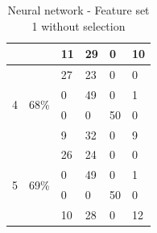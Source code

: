 \documentclass[USenglish]{ifimaster}  %
\begin{document}
\begin{table}[h]
\begin{tabular}{@{}llllll@{}}
			\multicolumn{1}{l|}{} & \multicolumn{1}{l|}{} & \multicolumn{1}{l|}{11} & \multicolumn{1}{l|}{29} & \multicolumn{1}{l|}{0} & 10 \\ \midrule
			\multicolumn{1}{l|}{\multirow{4}{*}{4}} & \multicolumn{1}{l|}{\multirow{4}{*}{68\%}} & \multicolumn{1}{l|}{27} & \multicolumn{1}{l|}{23} & \multicolumn{1}{l|}{0} & 0 \\ \cmidrule(l){3-6} 
			\multicolumn{1}{l|}{} & \multicolumn{1}{l|}{} & \multicolumn{1}{l|}{0} & \multicolumn{1}{l|}{49} & \multicolumn{1}{l|}{0} & 1 \\ \cmidrule(l){3-6} 
			\multicolumn{1}{l|}{} & \multicolumn{1}{l|}{} & \multicolumn{1}{l|}{0} & \multicolumn{1}{l|}{0} & \multicolumn{1}{l|}{50} & 0 \\ \cmidrule(l){3-6} 
			\multicolumn{1}{l|}{} & \multicolumn{1}{l|}{} & \multicolumn{1}{l|}{9} & \multicolumn{1}{l|}{32} & \multicolumn{1}{l|}{0} & 9 \\ \midrule
			\multicolumn{1}{l|}{\multirow{4}{*}{5}} & \multicolumn{1}{l|}{\multirow{4}{*}{69\%}} & \multicolumn{1}{l|}{26} & \multicolumn{1}{l|}{24} & \multicolumn{1}{l|}{0} & 0 \\ \cmidrule(l){3-6} 
			\multicolumn{1}{l|}{} & \multicolumn{1}{l|}{} & \multicolumn{1}{l|}{0} & \multicolumn{1}{l|}{49} & \multicolumn{1}{l|}{0} & 1 \\ \cmidrule(l){3-6} 
			\multicolumn{1}{l|}{} & \multicolumn{1}{l|}{} & \multicolumn{1}{l|}{0} & \multicolumn{1}{l|}{0} & \multicolumn{1}{l|}{50} & 0 \\ \cmidrule(l){3-6} 
			\multicolumn{1}{l|}{} & \multicolumn{1}{l|}{} & \multicolumn{1}{l|}{10} & \multicolumn{1}{l|}{28} & \multicolumn{1}{l|}{0} & 12 \\ \bottomrule
		\end{tabular}
		\caption{Neural network - Feature set 1 without selection}
		\label{nn2}
	\end{table}
	\FloatBarrier
\end{document}
